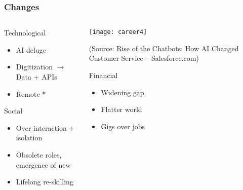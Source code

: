 \begin{frame}[fragile]\frametitle{Changes}
\begin{columns}
    \begin{column}[T]{0.5\linewidth}
			Technological
      \begin{itemize}
			\item AI deluge
			\item Digitization $\rightarrow$ Data + APIs
			\item Remote *
			\end{itemize}
			
			Social
      \begin{itemize}
			\item Over interaction + isolation
			\item Obsolete roles, emergence of new
			\item Lifelong re-skilling
			\end{itemize}			


    \end{column}
    \begin{column}[T]{0.5\linewidth}
\begin{center}
\texttt{[image: career4]}
\end{center}

{\tiny (Source: Rise of the Chatbots: How AI Changed Customer Service – Salesforce.com)}

		Financial
      \begin{itemize}
			\item Widening gap
			\item Flatter world
			\item Gigs over jobs
			\end{itemize}
    \end{column}
  \end{columns}
\end{frame}


